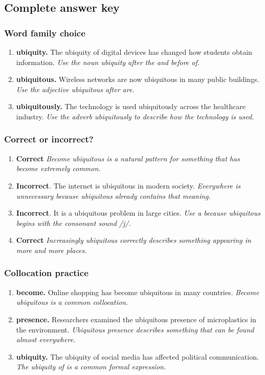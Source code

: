 \documentclass[11pt]{article}
\begin{document}
\subsection{Complete answer key}
\subsubsection{Word family choice}
\begin{enumerate}
  \item \textbf{ubiquity.} The ubiquity of digital devices has changed how students obtain information. \emph{Use the noun ubiquity after the and before of.}
  \item \textbf{ubiquitous.} Wireless networks are now ubiquitous in many public buildings. \emph{Use the adjective ubiquitous after are.}
  \item \textbf{ubiquitously.} The technology is used ubiquitously across the healthcare industry. \emph{Use the adverb ubiquitously to describe how the technology is used.}
\end{enumerate}

\subsubsection{Correct or incorrect?}
\begin{enumerate}
  \item \textbf{Correct} \emph{Become ubiquitous is a natural pattern for something that has become extremely common.}
  \item \textbf{Incorrect}. The internet is ubiquitous in modern society. \emph{Everywhere is unnecessary because ubiquitous already contains that meaning.}
  \item \textbf{Incorrect}. It is a ubiquitous problem in large cities. \emph{Use a because ubiquitous begins with the consonant sound /j/.}
  \item \textbf{Correct} \emph{Increasingly ubiquitous correctly describes something appearing in more and more places.}
\end{enumerate}

\subsubsection{Collocation practice}
\begin{enumerate}
  \item \textbf{become.} Online shopping has become ubiquitous in many countries. \emph{Become ubiquitous is a common collocation.}
  \item \textbf{presence.} Researchers examined the ubiquitous presence of microplastics in the environment. \emph{Ubiquitous presence describes something that can be found almost everywhere.}
  \item \textbf{ubiquity.} The ubiquity of social media has affected political communication. \emph{The ubiquity of is a common formal expression.}
\end{enumerate}
\end{document}
